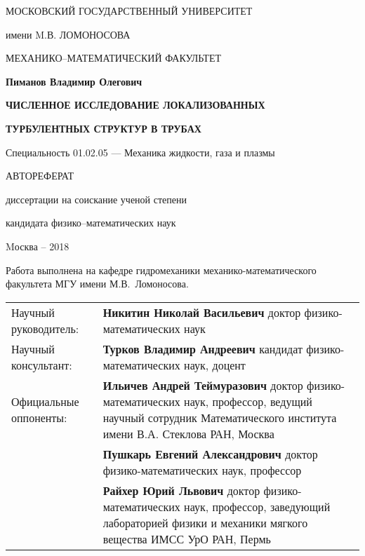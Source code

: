 \documentclass[a4paper,14pt,
russcorr,
oneside]{extbook}
\begin{document}
 \sloppy

\thispagestyle{empty}
\centerline{МОСКОВСКИЙ ГОСУДАРСТВЕННЫЙ УНИВЕРСИТЕТ}
\centerline{имени M.В. ЛОМОНОСОВА}
\centerline{МЕХАНИКО--МАТЕМАТИЧЕСКИЙ ФАКУЛЬТЕТ}

\vfill

\vfill
\vfill

\centerline{\bf Пиманов Владимир Олегович} \vfill
\centerline{\bf ЧИСЛЕННОЕ ИССЛЕДОВАНИЕ ЛОКАЛИЗОВАННЫХ}
\centerline{\bf ТУРБУЛЕНТНЫХ СТРУКТУР В ТРУБАХ}
 \centerline{\bf}
 \centerline{\bf }
\centerline{Специальность 01.02.05
--- Механика жидкости, газа и плазмы} 
\vfill \vfill
\centerline{АВТОРЕФЕРАТ}
\centerline{диссертации на соискание ученой степени} 
\centerline{кандидата физико--математических наук} 
\vfill \vfill \vfill \vfill 
\centerline{Mосква -- 2018}
\normalsize


\newcommand{\vsp}{\vspace{0.25cm}}

\newpage
{}
\thispagestyle{empty} \noindent Работа выполнена на кафедре гидромеханики механико-математического факультета МГУ имени М.В.~Ломоносова.

\vsp

\noindent \begin{tabular}{@{}p{5.8cm}p{11.3cm}@{}}
Научный руководитель: & \textbf{Никитин Николай Васильевич}
доктор физико-математических наук\vsp \\
Научный консультант: & \textbf{Турков Владимир Андреевич}
кандидат физико-математических наук, доцент\vsp \\
Официальные оппоненты: & \textbf{Ильичев Андрей Теймуразович}
доктор физико-математических наук, профессор,
ведущий научный сотрудник Математического
института имени В.А. Стеклова РАН, Москва\vsp\\
&
\textbf{Пушкарь Евгений Александрович}
доктор физико-математических наук, профессор\vsp\\
&
\textbf{Райхер Юрий Львович}
доктор физико-математических наук, профессор,
заведующий лабораторией физики и механики
мягкого вещества ИМСС УрО РАН, Пермь\vsp\\
\end{tabular}
\vspace{1mm}
\end{document}
